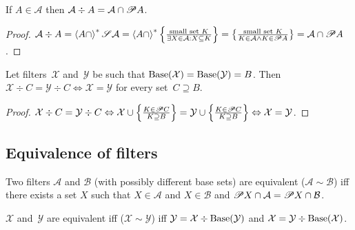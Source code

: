 \begin{prop}
If $A\in\mathcal{A}$ then
$\mathcal{A}\div A=\mathcal{A}\cap\mathscr{P} A$.
\end{prop}

\begin{proof}
$\mathcal{A}\div A=
\left\langle A\cap\right\rangle ^{\ast}\mathscr{S}\mathcal{A} =
\left\langle A\cap\right\rangle ^{\ast}\left\{ \frac{\text{small set }K}{
\exists X\in\mathcal{A}:X\subseteq K}\right\} =
\left\{ \frac{\text{small set }K}{
K\in\mathcal{A}\land K\in\mathscr{P} A}\right\} =
\mathcal{A}\cap\mathscr{P} A$.
\end{proof}

\begin{prop}
Let filters~$\mathcal{X}$
and~$\mathcal{Y}$ be such that
$\operatorname{Base}(\mathcal{X})=\operatorname{Base}(\mathcal{Y})=B$. Then
$\mathcal{X}\div C=\mathcal{Y}\div C
\Leftrightarrow \mathcal{X}=\mathcal{Y}$ for every
set~$C\supseteq B$.
\end{prop}

\begin{proof}
$\mathcal{X}\div C=\mathcal{Y}\div C\Leftrightarrow
\mathcal{X}\cup\left\{ \frac{K\in\mathscr{P} C}{K\supseteq B}\right\} = \mathcal{Y}\cup\left\{ \frac{K\in\mathscr{P} C}{K\supseteq B}\right\} \Leftrightarrow
\mathcal{X}=\mathcal{Y}$.
\end{proof}

\subsection{Equivalence of filters}

\begin{defn}
Two filters $\mathcal{A}$ and $\mathcal{B}$
(with possibly different base sets) are equivalent ($\mathcal{A}\sim\mathcal{B}$)
iff there exists a set $X$ such that $X\in\mathcal{A}$ and $X\in\mathcal{B}$
and $\mathscr{P} X\cap\mathcal{A}=\mathscr{P} X\cap\mathcal{B}$.\end{defn}

\begin{prop}
$\mathcal{X}$ and~$\mathcal{Y}$ are equivalent iff
($\mathcal{X}\sim\mathcal{Y}$) iff
$\mathcal{Y} = \mathcal{X} \div \operatorname{Base}(\mathcal{Y})$ and
$\mathcal{X} = \mathcal{Y} \div \operatorname{Base}(\mathcal{X})$.\end{prop}

